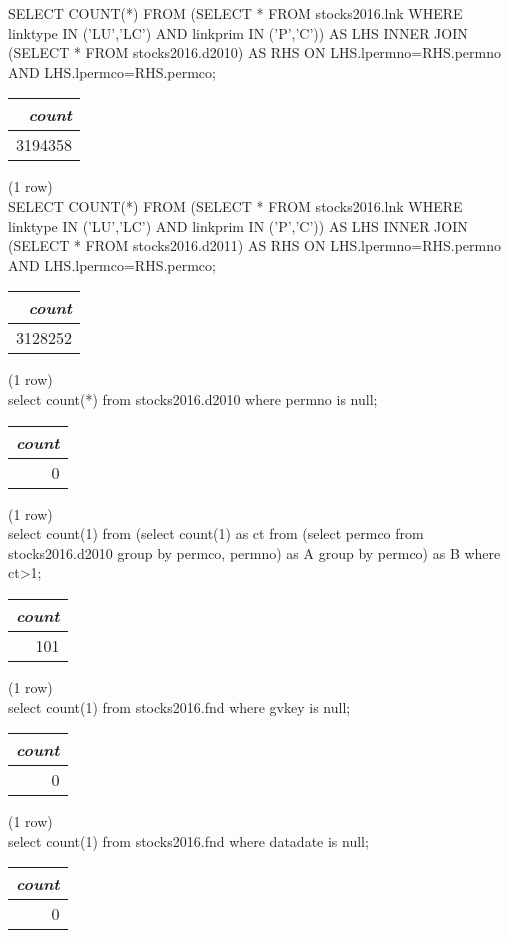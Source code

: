 SELECT COUNT(*) FROM
(SELECT * FROM stocks2016.lnk WHERE linktype IN ('LU','LC') AND linkprim IN ('P','C')) AS LHS
 INNER JOIN
(SELECT * FROM stocks2016.d2010) AS RHS
ON LHS.lpermno=RHS.permno AND LHS.lpermco=RHS.permco;
\begin{tabular}{r}
\textit{count} \\
\hline
3194358 \\
\end{tabular}

\noindent (1 row) \\

SELECT COUNT(*) FROM
(SELECT * FROM stocks2016.lnk WHERE linktype IN ('LU','LC') AND linkprim IN ('P','C')) AS LHS
 INNER JOIN
(SELECT * FROM stocks2016.d2011) AS RHS
ON LHS.lpermno=RHS.permno AND LHS.lpermco=RHS.permco;
\begin{tabular}{r}
\textit{count} \\
\hline
3128252 \\
\end{tabular}

\noindent (1 row) \\

select count(*)
from stocks2016.d2010
where permno is null;
\begin{tabular}{r}
\textit{count} \\
\hline
0 \\
\end{tabular}

\noindent (1 row) \\

select count(1)
from
  (select count(1) as ct from
    (select permco
    from stocks2016.d2010
    group by permco, permno) as A
  group by permco) as B
where ct>1;
\begin{tabular}{r}
\textit{count} \\
\hline
101 \\
\end{tabular}

\noindent (1 row) \\

select count(1) from stocks2016.fnd where gvkey is null;
\begin{tabular}{r}
\textit{count} \\
\hline
0 \\
\end{tabular}

\noindent (1 row) \\

select count(1) from stocks2016.fnd where datadate is null;
\begin{tabular}{r}
\textit{count} \\
\hline
0 \\
\end{tabular}

